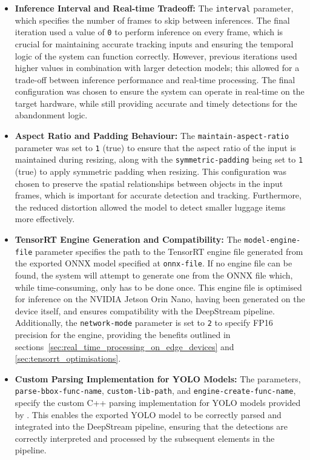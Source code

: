 \begin{itemize}
	\item \textbf{Inference Interval and Real-time Tradeoff:} The
	      \texttt{interval} parameter, which specifies the number
	      of frames to skip between inferences. The final iteration
	      used a value of \texttt{0} to perform inference on every frame,
	      which is crucial for maintaining accurate tracking inputs and
	      ensuring the temporal logic of the system can function correctly. However,
	      previous iterations used higher values in combination with larger detection models;
	      this allowed for a trade-off between inference performance and real-time processing.
	      The final configuration was chosen to ensure the system can operate in real-time on
	      the target hardware, while still providing accurate and timely detections for the abandonment logic.
	\item \textbf{Aspect Ratio and Padding Behaviour:} The \texttt{maintain-aspect-ratio}
	      parameter was set to \texttt{1} (true) to ensure that the aspect ratio of the input
	      is maintained during resizing, along with the \texttt{symmetric-padding} being set
	      to \texttt{1} (true) to apply symmetric padding when resizing. This configuration was chosen to
	      preserve the spatial relationships between objects in the input frames, which is important for
	      accurate detection and tracking. Furthermore, the reduced distortion allowed the
	      model to detect smaller luggage items more effectively.
	\item \textbf{TensorRT Engine Generation and Compatibility:} The \texttt{model-engine-file}
	      parameter specifies the path to the TensorRT engine file generated from the exported ONNX model
	      specified at \texttt{onnx-file}. If no engine file can be found, the system will attempt
	      to generate one from the ONNX file which, while time-consuming, only has to be done once.
	      This engine file is optimised for inference on the NVIDIA Jetson Orin Nano, having
	      been generated on the device itself, and ensures compatibility with the DeepStream pipeline.
	      Additionally, the \texttt{network-mode} parameter is set to \texttt{2} to specify FP16
	      precision for the engine, providing the benefits outlined in
	      sections~\ref{sec:real_time_processing_on_edge_devices} and \ref{sec:tensorrt_optimisations}.
	\item \textbf{Custom Parsing Implementation for YOLO Models:} The parameters,
	      \texttt{parse-bbox-func-name}, \texttt{custom-lib-path}, and \texttt{engine-create-func-name},
	      specify the custom C++ parsing implementation for YOLO models provided by \citet{luciano2026deepstreamyolo}.
	      This enables the exported YOLO model to be correctly parsed and integrated into the DeepStream pipeline,
	      ensuring that the detections are correctly interpreted and processed by the subsequent elements in the pipeline.
\end{itemize}

